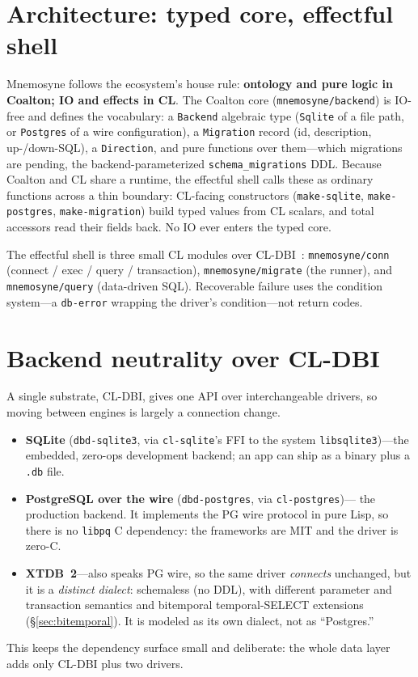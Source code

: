 \documentclass[11pt,a4paper]{article}
\begin{document}
\section{Architecture: typed core, effectful shell}
\label{sec:arch}
Mnemosyne follows the ecosystem's house rule: \textbf{ontology and pure logic in Coalton;
IO and effects in CL}. The Coalton core (\texttt{mnemosyne/backend}) is IO-free and defines
the vocabulary: a \texttt{Backend} algebraic type (\texttt{Sqlite} of a file path, or
\texttt{Postgres} of a wire configuration), a \texttt{Migration} record (id, description,
up-/down-SQL), a \texttt{Direction}, and pure functions over them---which migrations are
pending, the backend-parameterized \texttt{schema\_migrations} DDL. Because Coalton and CL
share a runtime, the effectful shell calls these as ordinary functions across a thin
boundary: CL-facing constructors (\texttt{make-sqlite}, \texttt{make-postgres},
\texttt{make-migration}) build typed values from CL scalars, and total accessors read their
fields back. No IO ever enters the typed core.

The effectful shell is three small CL modules over CL-DBI~\citep{cldbi}:
\texttt{mnemosyne/conn} (connect / exec / query / transaction), \texttt{mnemosyne/migrate}
(the runner), and \texttt{mnemosyne/query} (data-driven SQL). Recoverable failure uses the
condition system---a \texttt{db-error} wrapping the driver's condition---not return codes.

\section{Backend neutrality over CL-DBI}
\label{sec:backends}
A single substrate, CL-DBI, gives one API over interchangeable drivers, so moving between
engines is largely a connection change.
\begin{itemize}
\item \textbf{SQLite} (\texttt{dbd-sqlite3}, via \texttt{cl-sqlite}'s FFI to the system
  \texttt{libsqlite3})---the embedded, zero-ops development backend; an app can ship as a
  binary plus a \texttt{.db} file.
\item \textbf{PostgreSQL over the wire} (\texttt{dbd-postgres}, via \texttt{cl-postgres})---
  the production backend. It implements the PG wire protocol in pure Lisp, so there is no
  \texttt{libpq} C dependency: the frameworks are MIT and the driver is zero-C.
\item \textbf{XTDB~2}---also speaks PG wire, so the same driver \emph{connects} unchanged,
  but it is a \emph{distinct dialect}: schemaless (no DDL), with different parameter and
  transaction semantics and bitemporal temporal-SELECT extensions
  (\S\ref{sec:bitemporal}). It is modeled as its own dialect, not as ``Postgres.''
\end{itemize}
This keeps the dependency surface small and deliberate: the whole data layer adds only
CL-DBI plus two drivers.
\end{document}
